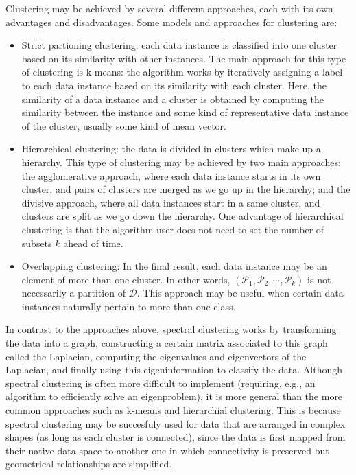 Clustering may be achieved by several different approaches, each with its own advantages and disadvantages.
Some models and approaches for clustering are:
\begin{itemize}
   \item Strict partioning clustering: each data instance is classified into one cluster based on its similarity with other instances.
      The main approach for this type of clustering is k-means: the algorithm works by iteratively assigning a label to each data instance based on its similarity with each cluster.
      Here, the similarity of a data instance and a cluster is obtained by computing the similarity between the instance and some kind of representative data instance of the cluster, usually some kind of mean vector.
   \item Hierarchical clustering: the data is divided in clusters which make up a hierarchy.
      This type of clustering may be achieved by two main approaches: the agglomerative approach, where each data instance starts in its own cluster, and pairs of clusters are merged as we go up in the hierarchy; and the divisive approach, where all data instances start in a same cluster, and clusters are split as we go down the hierarchy.
      One advantage of hierarchical clustering is that the algorithm user does not need to set the number of subsets $k$ ahead of time.
   \item Overlapping clustering: In the final result, each data instance may be an element of more than one cluster.
      In other words, $(\mathcal P_1, \mathcal P_2, \cdots, \mathcal P_k)$ is not necessarily a partition of $\mathcal D$.
      This approach may be useful when certain data instances naturally pertain to more than one class.
\end{itemize}

In contrast to the approaches above, spectral clustering works by transforming the data into a graph, constructing a certain matrix associated to this graph called the Laplacian, computing the eigenvalues and eigenvectors of the Laplacian, and finally using this eigeninformation to classify the data.
Although spectral clustering is often more difficult to implement (requiring, e.g., an algorithm to efficiently solve an eigenproblem), it is more general than the more common approaches such as k-means and hierarchial clustering.
This is because spectral clustering may be succesfuly used for data that are arranged in complex shapes (as long as each cluster is connected), since the data is first mapped from their native data space to another one in which connectivity is preserved but geometrical relationships are simplified.

